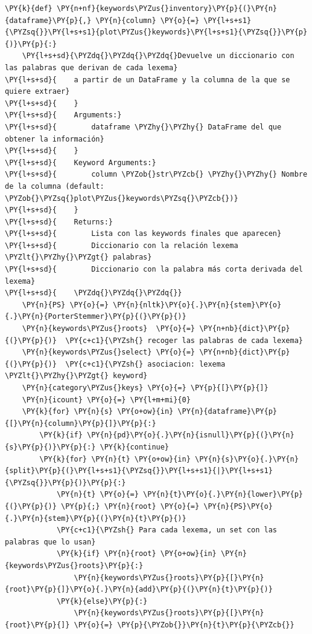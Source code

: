     \begin{tcolorbox}[breakable, size=fbox, boxrule=1pt, pad at break*=1mm,colback=cellbackground, colframe=cellborder]
\begin{Verbatim}[commandchars=\\\{\}]
\PY{k}{def} \PY{n+nf}{keywords\PYZus{}inventory}\PY{p}{(}\PY{n}{dataframe}\PY{p}{,} \PY{n}{column} \PY{o}{=} \PY{l+s+s1}{\PYZsq{}}\PY{l+s+s1}{plot\PYZus{}keywords}\PY{l+s+s1}{\PYZsq{}}\PY{p}{)}\PY{p}{:}
    \PY{l+s+sd}{\PYZdq{}\PYZdq{}\PYZdq{}Devuelve un diccionario con las palabras que derivan de cada lexema}
\PY{l+s+sd}{    a partir de un DataFrame y la columna de la que se quiere extraer}
\PY{l+s+sd}{    }
\PY{l+s+sd}{    Arguments:}
\PY{l+s+sd}{        dataframe \PYZhy{}\PYZhy{} DataFrame del que obtener la información}
\PY{l+s+sd}{    }
\PY{l+s+sd}{    Keyword Arguments:}
\PY{l+s+sd}{        column \PYZob{}str\PYZcb{} \PYZhy{}\PYZhy{} Nombre de la columna (default: \PYZob{}\PYZsq{}plot\PYZus{}keywords\PYZsq{}\PYZcb{})}
\PY{l+s+sd}{    }
\PY{l+s+sd}{    Returns:}
\PY{l+s+sd}{        Lista con las keywords finales que aparecen}
\PY{l+s+sd}{        Diccionario con la relación lexema \PYZlt{}\PYZhy{}\PYZgt{} palabras}
\PY{l+s+sd}{        Diccionario con la palabra más corta derivada del lexema}
\PY{l+s+sd}{    \PYZdq{}\PYZdq{}\PYZdq{}}
    \PY{n}{PS} \PY{o}{=} \PY{n}{nltk}\PY{o}{.}\PY{n}{stem}\PY{o}{.}\PY{n}{PorterStemmer}\PY{p}{(}\PY{p}{)}
    \PY{n}{keywords\PYZus{}roots}  \PY{o}{=} \PY{n+nb}{dict}\PY{p}{(}\PY{p}{)}  \PY{c+c1}{\PYZsh{} recoger las palabras de cada lexema}
    \PY{n}{keywords\PYZus{}select} \PY{o}{=} \PY{n+nb}{dict}\PY{p}{(}\PY{p}{)}  \PY{c+c1}{\PYZsh{} asociacion: lexema \PYZlt{}\PYZhy{}\PYZgt{} keyword}
    \PY{n}{category\PYZus{}keys} \PY{o}{=} \PY{p}{[}\PY{p}{]}
    \PY{n}{icount} \PY{o}{=} \PY{l+m+mi}{0}
    \PY{k}{for} \PY{n}{s} \PY{o+ow}{in} \PY{n}{dataframe}\PY{p}{[}\PY{n}{column}\PY{p}{]}\PY{p}{:}
        \PY{k}{if} \PY{n}{pd}\PY{o}{.}\PY{n}{isnull}\PY{p}{(}\PY{n}{s}\PY{p}{)}\PY{p}{:} \PY{k}{continue}
        \PY{k}{for} \PY{n}{t} \PY{o+ow}{in} \PY{n}{s}\PY{o}{.}\PY{n}{split}\PY{p}{(}\PY{l+s+s1}{\PYZsq{}}\PY{l+s+s1}{|}\PY{l+s+s1}{\PYZsq{}}\PY{p}{)}\PY{p}{:}
            \PY{n}{t} \PY{o}{=} \PY{n}{t}\PY{o}{.}\PY{n}{lower}\PY{p}{(}\PY{p}{)} \PY{p}{;} \PY{n}{root} \PY{o}{=} \PY{n}{PS}\PY{o}{.}\PY{n}{stem}\PY{p}{(}\PY{n}{t}\PY{p}{)}
            \PY{c+c1}{\PYZsh{} Para cada lexema, un set con las palabras que lo usan}
            \PY{k}{if} \PY{n}{root} \PY{o+ow}{in} \PY{n}{keywords\PYZus{}roots}\PY{p}{:}                
                \PY{n}{keywords\PYZus{}roots}\PY{p}{[}\PY{n}{root}\PY{p}{]}\PY{o}{.}\PY{n}{add}\PY{p}{(}\PY{n}{t}\PY{p}{)}
            \PY{k}{else}\PY{p}{:}
                \PY{n}{keywords\PYZus{}roots}\PY{p}{[}\PY{n}{root}\PY{p}{]} \PY{o}{=} \PY{p}{\PYZob{}}\PY{n}{t}\PY{p}{\PYZcb{}}
    

\end{Verbatim}
\end{tcolorbox}
